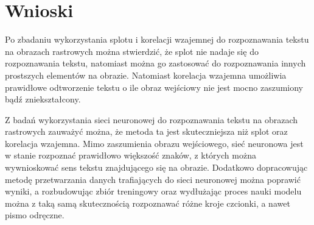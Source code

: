 \documentclass{article}
\begin{document}
\section{Wnioski}
Po zbadaniu wykorzystania splotu i korelacji wzajemnej do rozpoznawania tekstu na obrazach rastrowych można stwierdzić, że splot nie nadaje się do rozpoznawania tekstu, natomiast można go zastosować do rozpoznawania innych prostszych elementów na obrazie. Natomiast korelacja wzajemna umożliwia prawidłowe odtworzenie tekstu o ile obraz wejściowy nie jest mocno zaszumiony bądź zniekształcony.

Z badań wykorzystania sieci neuronowej do rozpoznawania tekstu na obrazach rastrowych zauważyć można, że metoda ta jest skuteczniejsza niż splot oraz korelacja wzajemna. Mimo zaszumienia obrazu wejściowego, sieć neuronowa jest w stanie rozpoznać prawidłowo większość znaków, z których można wywnioskować sens tekstu znajdującego się na obrazie. Dodatkowo dopracowując metodę przetwarzania danych trafiających do sieci neuronowej można poprawić wyniki, a rozbudowując zbiór treningowy oraz wydłużając proces nauki modelu można z taką samą skutecznością rozpoznawać różne kroje czcionki, a nawet pismo odręczne.
\end{document}
